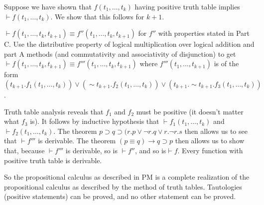 \documentclass[12pt]{article}
\begin{document}
Suppose we have shown that $f(t_1,\ldots,t_k)$ having positive truth table implies $\vdash f(t_1,\ldots,t_k)$.  We show that this follows for $k+1$.

$\vdash f(t_1,\ldots,t_k,t_{k+1}) \equiv f''(t_1,\ldots,t_k,t_{k+1})$ for $f''$ with properties stated in Part C.  Use the distributive property of logical multiplication over logical addition and part A methods (and commutativity and associativity of disjunction) to get $\vdash f(t_1,\ldots,t_k,t_{k+1}) \equiv f'''(t_1,\ldots,t_k,t_{k+1})$  where $f'''(t_1,\ldots,t_{k+1})$ is of
the form $(t_{k+1}.f_1(t_1,\ldots,t_k)) \vee (\sim t_{k+1}.f_2(t_1,\ldots,t_k)) \vee (t_{k+1}.\sim t_{k+1}.f_3(t_1,\ldots,t_k))$.

Truth table analysis reveals that $f_1$ and $f_2$ must be positive (it doesn't matter what $f_3$ is).  It follows by inductive hypothesis that
$\vdash f_1(t_1,\ldots,t_k)$ and $\vdash f_2(t_1,\ldots,t_k)$.  The theorem $p \supset q \supset (r .p \vee \neg r.q \vee r.\neg r.s$ then allows us to see
that $\vdash f'''$ is derivable.  The theorem $(p \equiv q) \rightarrow q \supset p$ then allows us to show that, because $\vdash f'''$ is derivable, so is $\vdash f''$, and so is$\vdash f$.
Every function with positive truth table is derivable.

So the propositional calculus as described in PM is a complete realization of the propositional calculus as described by the method of truth tables.  Tautologies (positive statements) can be proved, and no other statement can be proved.
\end{document}
